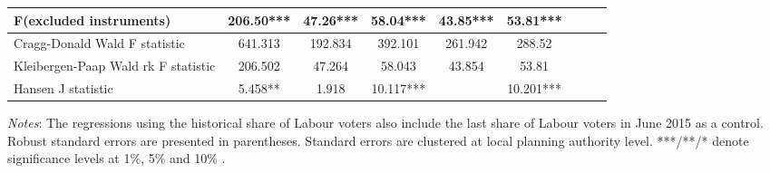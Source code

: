 \documentclass[12pt,letterpaper]{article}
\begin{document}
\begin{table}[h!]
{\begin{tabular}{@{}lcccccccc@{}}
F(excluded instruments)             & 206.50***    & 47.26***     & 58.04***     & 43.85***    &   53.81***          \\
\hline
Cragg-Donald Wald F statistic       & 641.313      & 192.834      & 392.101      & 261.942      &  288.52         \\
Kleibergen-Paap Wald rk F statistic & 206.502      & 47.264       & 58.043       & 43.854       &      53.81     \\
Hansen J statistic                  & 5.458**      & 1.918        & 10.117***    &                & 10.201***         \\ \bottomrule               
\end{tabular}}
\begin{tablenotes}
      \scriptsize
      \item {\it{Notes}}: The regressions using the historical share of Labour voters
      also include the last share of Labour voters in June 2015 as a control. Robust standard errors 
      are presented in parentheses. Standard errors are clustered at local planning 
      authority level. ***/**/* denote significance levels at 1\%, 5\% and
      10\% . 
    \end{tablenotes}
\end{table}







\newpage
\end{document}
